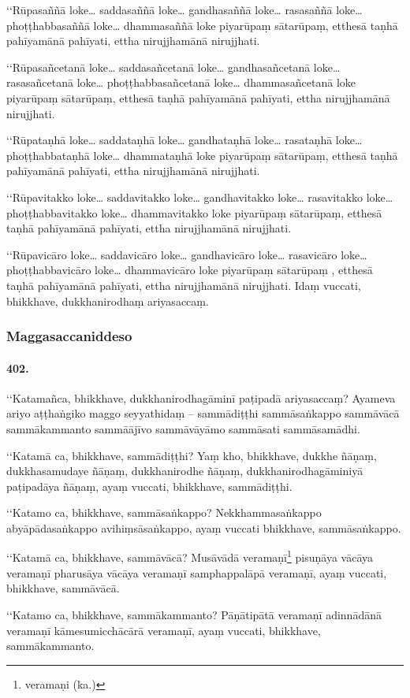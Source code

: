 ‘‘Rūpasaññā loke… saddasaññā loke… gandhasaññā loke… rasasaññā loke… phoṭṭhabbasaññā loke… dhammasaññā loke piyarūpaṃ sātarūpaṃ, etthesā taṇhā pahīyamānā pahīyati, ettha nirujjhamānā nirujjhati.

‘‘Rūpasañcetanā loke… saddasañcetanā loke… gandhasañcetanā loke… rasasañcetanā loke… phoṭṭhabbasañcetanā loke… dhammasañcetanā loke piyarūpaṃ sātarūpaṃ, etthesā taṇhā pahīyamānā pahīyati, ettha nirujjhamānā nirujjhati.

‘‘Rūpataṇhā loke… saddataṇhā loke… gandhataṇhā loke… rasataṇhā loke… phoṭṭhabbataṇhā loke… dhammataṇhā loke piyarūpaṃ sātarūpaṃ, etthesā taṇhā pahīyamānā pahīyati, ettha nirujjhamānā nirujjhati.

‘‘Rūpavitakko loke… saddavitakko loke… gandhavitakko loke… rasavitakko loke… phoṭṭhabbavitakko loke… dhammavitakko loke piyarūpaṃ sātarūpaṃ, etthesā taṇhā pahīyamānā pahīyati, ettha nirujjhamānā nirujjhati.

‘‘Rūpavicāro loke… saddavicāro loke… gandhavicāro loke… rasavicāro loke… phoṭṭhabbavicāro loke… dhammavicāro loke piyarūpaṃ sātarūpaṃ , etthesā taṇhā pahīyamānā pahīyati, ettha nirujjhamānā nirujjhati. Idaṃ vuccati, bhikkhave, dukkhanirodhaṃ ariyasaccaṃ.

\subsubsection{Maggasaccaniddeso}

\paragraph{402.} ‘‘Katamañca, bhikkhave, dukkhanirodhagāminī paṭipadā ariyasaccaṃ? Ayameva ariyo aṭṭhaṅgiko maggo seyyathidaṃ – sammādiṭṭhi sammāsaṅkappo sammāvācā sammākammanto sammāājīvo sammāvāyāmo sammāsati sammāsamādhi.

‘‘Katamā ca, bhikkhave, sammādiṭṭhi? Yaṃ kho, bhikkhave, dukkhe ñāṇaṃ, dukkhasamudaye ñāṇaṃ, dukkhanirodhe ñāṇaṃ, dukkhanirodhagāminiyā paṭipadāya ñāṇaṃ, ayaṃ vuccati, bhikkhave, sammādiṭṭhi.

‘‘Katamo ca, bhikkhave, sammāsaṅkappo? Nekkhammasaṅkappo abyāpādasaṅkappo avihiṃsāsaṅkappo, ayaṃ vuccati bhikkhave, sammāsaṅkappo.

‘‘Katamā ca, bhikkhave, sammāvācā? Musāvādā veramaṇī\footnote{veramaṇi (ka.)} pisuṇāya vācāya veramaṇī pharusāya vācāya veramaṇī samphappalāpā veramaṇī, ayaṃ vuccati, bhikkhave, sammāvācā.

‘‘Katamo ca, bhikkhave, sammākammanto? Pāṇātipātā veramaṇī adinnādānā veramaṇī kāmesumicchācārā veramaṇī, ayaṃ vuccati, bhikkhave, sammākammanto.

